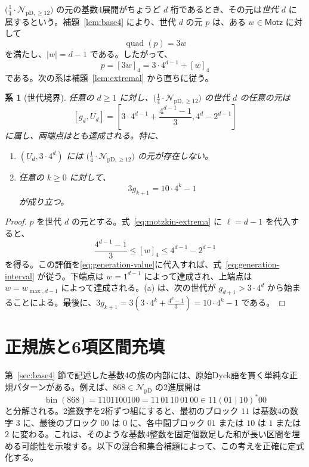 \documentclass[12pt]{ltjsarticle}
\theoremstyle{plain}
\newtheorem{corollary}[theorem]{系}
\theoremstyle{definition}
\theoremstyle{plain}
\newcommand{\NpD}{\mathcal{N}_{\mathrm{pD}}}
\newcommand{\Pset}{%
  \bigl(\tfrac{1}{4}\cdot\mathcal{N}_{\mathrm{pD},\geq 12}\bigr)%
}
\begin{document}
$\Pset$ の元の基数4展開がちょうど $d$ 桁であるとき、その元は\emph{世代 $d$} に
属するという。補題~\ref{lem:base4} により、世代 $d$ の元 $p$ は、ある
$w\in\mathsf{Motz}$ に対して
\[
 \operatorname{quad}(p)=3w
\]
を満たし、$|w|=d-1$ である。したがって、
\begin{equation}\label{eq:generation-value}
 p=[3w]_4=3\cdot4^{d-1}+[w]_4
\end{equation}
である。次の系は補題~\ref{lem:extremal} から直ちに従う。

\begin{corollary}[世代境界]\label{cor:gen}
任意の $d\geq1$ に対し、$\Pset$ の世代 $d$ の任意の元は
\begin{equation}\label{eq:generation-interval}
  [g_d,U_d]
  =\left[
  3\cdot4^{d-1}+\frac{4^{d-1}-1}{3},
  4^d-2^{d-1}
  \right]
\end{equation}
に属し、両端点はとも達成される。特に、
\begin{enumerate}[label=\textup{(\alph*)}]
\item $(U_d,3\cdot4^d)$ には $\Pset$ の元が存在しない。
\item 任意の $k\geq0$ に対して、
\begin{equation}\label{eq:three-g}
  3g_{k+1}=10\cdot4^k-1
\end{equation}
が成り立つ。
\end{enumerate}
\end{corollary}

\begin{proof}
$p$ を世代 $d$ の元とする。式~\eqref{eq:motzkin-extrema} に $\ell=d-1$ を代入すると、
\[
 \frac{4^{d-1}-1}{3}
 \leq[w]_4
 \leq4^{d-1}-2^{d-1}
\]
を得る。この評価を\eqref{eq:generation-value}に代入すれば、式~\eqref{eq:generation-interval}
が従う。下端点は $w=1^{d-1}$ によって達成され、上端点は
$w=w_{\max,d-1}$ によって達成される。(a) は、次の世代が
$g_{d+1}>3\cdot4^d$ から始まることによる。最後に、$  3g_{k+1}
  =3\left(3\cdot4^k+\frac{4^k-1}{3}\right)
  =10\cdot4^k-1$
である。
\end{proof}

\section{正規族と6項区間充填}\label{sec:regular}

第~\ref{sec:base4} 節で記述した基数4の族の内部には、原始Dyck語を貫く単純な正規パターンがある。例えば、$868\in\NpD$ の2進展開は
\[
 \operatorname{bin}(868)=1101100100=11\,01\,10\,01\,00
 \in 11(01\mid10)^*00
\]
と分解される。2進数字を2桁ずつ組にすると、最初のブロック $11$ は基数4の数字 $3$ に、最後のブロック $00$ は $0$ に、各中間ブロック $01$ または $10$ は $1$ または $2$ に変わる。これは、そのような基数4整数を固定個数足した和が長い区間を埋める可能性を示唆する。以下の混合和集合補題によって、この考えを正確に定式化する。
\end{document}
